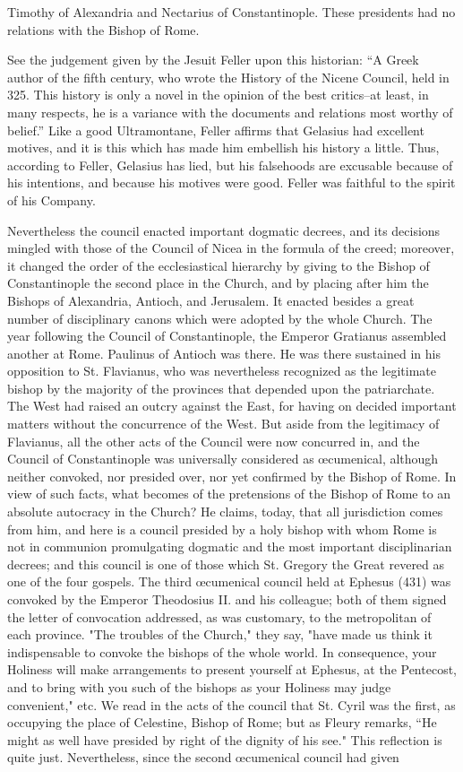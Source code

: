 Timothy of Alexandria and Nectarius of Constantinople. These presidents had no relations with the Bishop of Rome.

See the judgement given by the Jesuit Feller upon this historian: “A Greek author of the fifth century, who wrote the History of the Nicene Council, held in 325. This history is only a novel in the opinion of the best critics--at least, in many respects, he is a variance with the documents and relations most worthy of belief.” Like a good Ultramontane, Feller affirms that Gelasius had excellent motives, and it is this which has made him embellish his history a little. Thus, according to Feller, Gelasius has lied, but his falsehoods are excusable because of his intentions, and because his motives were good. Feller was faithful to the spirit of his Company.

Nevertheless the council enacted important dogmatic decrees, and its decisions mingled with those of the Council of Nicea in the formula of the creed; moreover, it changed the order of the ecclesiastical hierarchy by giving to the Bishop of Constantinople the second place in the Church, and by placing after him the Bishops of Alexandria, Antioch, and Jerusalem. It enacted besides a great number of disciplinary canons which were adopted by the whole Church. The year following the Council of Constantinople, the Emperor Gratianus assembled another at Rome. Paulinus of Antioch was there. He was there sustained in his opposition to St. Flavianus, who was nevertheless recognized as the legitimate bishop by the majority of the provinces that depended upon the patriarchate. The West had raised an outcry against the East, for having on decided important matters without the concurrence of the West. But aside from the legitimacy of Flavianus, all the other acts of the Council were now concurred in, and the Council of Constantinople was universally considered as œcumenical, although neither convoked, nor presided over, nor yet confirmed by the Bishop of Rome. In view of such facts, what becomes of the pretensions of the Bishop of Rome to an absolute autocracy in the Church? He claims, today, that all jurisdiction comes from him, and here is a council presided by a holy bishop with whom Rome is not in communion promulgating dogmatic and the most important disciplinarian decrees; and this council is one of those which St. Gregory the Great revered as one of the four gospels. The third œcumenical council held at Ephesus (431) was convoked by the Emperor Theodosius II. and his colleague; both of them signed the letter of convocation addressed, as was customary, to the metropolitan of each province. "The troubles of the Church," they say, "have made us think it indispensable to convoke the bishops of the whole world. In consequence, your Holiness will make arrangements to present yourself at Ephesus, at the Pentecost, and to bring with you such of the bishops as your Holiness may judge convenient," etc. We read in the acts of the council that St. Cyril was the first, as occupying the place of Celestine, Bishop of Rome; but as Fleury remarks, “He might as well have presided by right of the dignity of his see." This reflection is quite just. Nevertheless, since the second œcumenical council had given 